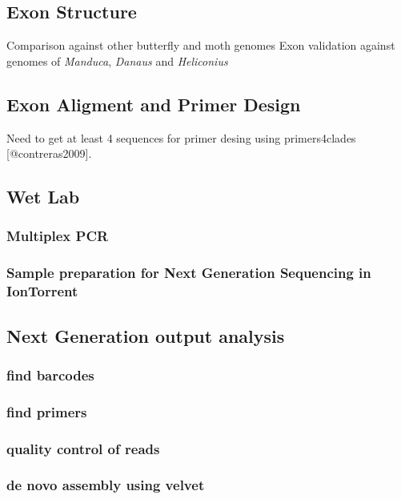 \documentclass[a4paper]{article}
\begin{document}
\subsection{Exon Structure}

Comparison against other butterfly and moth genomes Exon validation
against genomes of \emph{Manduca}, \emph{Danaus} and \emph{Heliconius}

\subsection{Exon Aligment and Primer Design}

Need to get at least 4 sequences for primer desing using primers4clades
{[}@contreras2009{]}.

\subsection{Wet Lab}

\subsubsection{Multiplex PCR}

\subsubsection{Sample preparation for Next Generation Sequencing in
IonTorrent}

\subsection{Next Generation output analysis}

\subsubsection{find barcodes}

\subsubsection{find primers}

\subsubsection{quality control of reads}

\subsubsection{de novo assembly using velvet}
\end{document}
